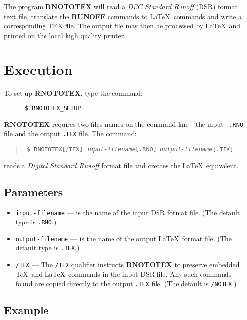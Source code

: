 The program {\bf RNOTOTEX} will read a {\em DEC Standard Runoff} (DSR) format
text file, translate the {\bf RUNOFF} commands to \LaTeX\ commands and write a
corresponding TEX file.  The output file may then be processed by \LaTeX\ and
printed on the local high quality printer.  

\section{Execution}

To set up {\bf RNOTOTEX}, type the command:

\begin{verbatim}
      $ RNOTOTEX_SETUP
\end{verbatim}

{\bf RNOTOTEX} requires two files names on the command line---the input {\tt
.RNO} file and the output {\tt .TEX} file. The command:

\begin{quote}\tt
\$ RNOTOTEX[/TEX] {\it input-filename}[.RNO] {\it output-filename}[.TEX]
\end{quote}

reads a {\em Digital Standard Runoff} format file and creates the \LaTeX\ 
equivalent.

\subsection{Parameters}

\begin{itemize}

\item{\tt input-filename} --- is the name of the input DSR format file.  
(The default type is {\tt .RNO}.)

\item{\tt output-filename} --- is the name of the output \LaTeX\ format file.  
(The default type is {\tt .TEX}.)

\item{\tt /TEX} --- The {\tt /TEX} qualifier instructs {\bf RNOTOTEX} to
preserve embedded \TeX\ and \LaTeX\ commands in the input DSR file.  Any such
commands found are copied directly to the output {\tt .TEX} file. (The default
is {\tt /NOTEX}.)

\end{itemize}

\subsection{Example}

